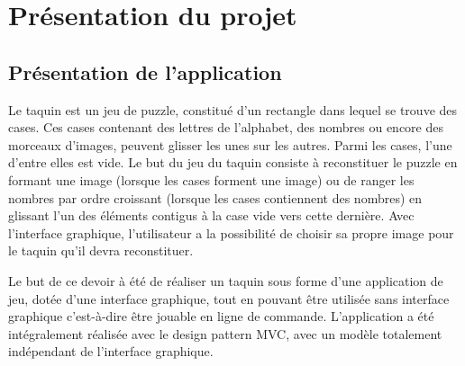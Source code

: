 \chapter{Présentation du projet}

	\section{Présentation de l'application}

		Le taquin est un jeu de puzzle, constitué d’un rectangle dans lequel se trouve des cases. Ces cases contenant des lettres de l'alphabet,
		des nombres ou encore des morceaux d’images, peuvent glisser les unes sur les autres. Parmi les cases, l’une d'entre elles est vide.
		Le but du jeu du taquin consiste à reconstituer le puzzle en formant une image (lorsque les cases forment une image) ou de ranger les nombres par ordre croissant
		(lorsque les cases contiennent des nombres) en glissant l'un des éléments contigus à la case vide vers cette dernière. Avec l’interface graphique, l'utilisateur a la possibilité de choisir sa propre image pour le taquin qu’il devra reconstituer.

		Le but de ce devoir à été de réaliser un taquin sous forme d’une application de jeu, dotée d'une interface graphique, tout en pouvant être utilisée
		sans interface graphique c'est-à-dire être jouable en ligne de commande. L'application a été intégralement réalisée avec le design pattern MVC,
		avec un modèle totalement indépendant de l'interface graphique.
